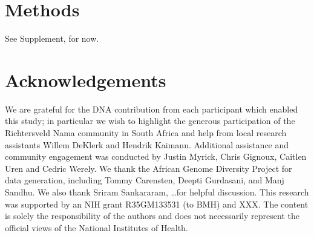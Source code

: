 \documentclass{article}
\begin{document}
\section*{Methods}

See Supplement, for now.

\section*{Acknowledgements}

We are grateful for the DNA contribution from each participant which enabled
this study; in particular we wish to highlight the generous participation of
the Richtersveld Nama community in South Africa and help from local research
assistants Willem DeKlerk and Hendrik Kaimann. Additional assistance and
community engagement was conducted by Justin Myrick, Chris Gignoux, Caitlen
Uren and Cedric Werely. We thank the African Genome Diversity Project for data
generation, including Tommy Carensten, Deepti Gurdasani, and Manj Sandhu. We
also thank Sriram Sankararam, \dots for helpful discussion. This research was
supported by an NIH grant R35GM133531 (to BMH) and XXX. The content is solely
the responsibility of the authors and does not necessarily represent the
official views of the National Institutes of Health.

\break



\end{document}
